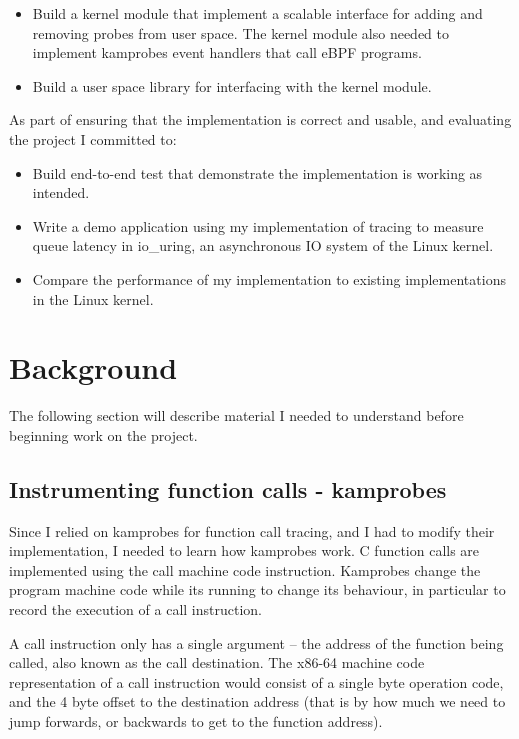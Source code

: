     \begin{itemize}
        \item Build a kernel module that implement a scalable interface for adding and removing probes from user space. The kernel module also needed to implement kamprobes event handlers that call eBPF programs.
        \item Build a user space library for interfacing with the kernel module.
    \end{itemize}

    As part of ensuring that the implementation is correct and usable, and evaluating the project I committed to:
    \begin{itemize}
        \item Build end-to-end test that demonstrate the implementation is working as intended.
        \item Write a demo application using my implementation of tracing to measure queue latency in io\_uring, an asynchronous IO system of the Linux kernel.
        \item Compare the performance of my implementation to existing implementations in the Linux kernel.
    \end{itemize}

\section{Background} 
    The following section will describe material I needed to understand before beginning work on the project.

    \subsection{Instrumenting function calls - kamprobes}
        Since I relied on kamprobes for function call tracing, and I had to modify their implementation, I needed to learn how kamprobes work. C function calls are implemented using the call machine code instruction. Kamprobes change the program machine code while its running to change its behaviour, in particular to record the execution of a call instruction.

        A call instruction only has a single argument -- the address of the function being called, also known as the call destination. The x86-64 machine code representation of a call instruction would consist of a single byte operation code, and the 4 byte offset to the destination address (that is by how much we need to jump forwards, or backwards to get to the function address).

